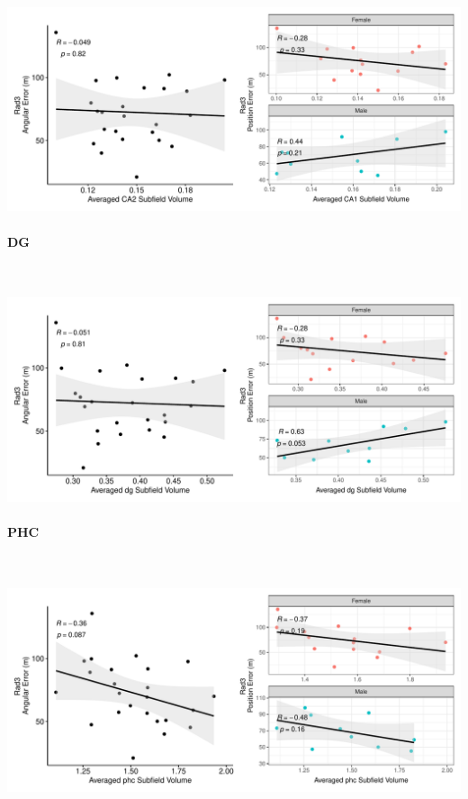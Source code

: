 \documentclass[
]{article}
\begin{document}
\includegraphics{hippocampal_subfield_files/figure-latex/unnamed-chunk-9-1.pdf}

\paragraph{DG}

~ \vspace{1cm}

\includegraphics{hippocampal_subfield_files/figure-latex/unnamed-chunk-10-1.pdf}

\newpage
\paragraph{PHC}

~ \vspace{1cm}

\includegraphics{hippocampal_subfield_files/figure-latex/unnamed-chunk-11-1.pdf}
\end{document}
